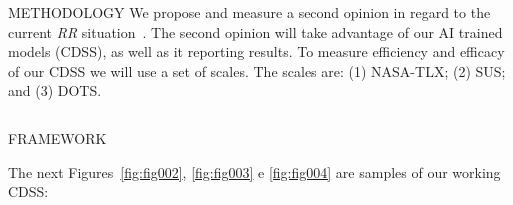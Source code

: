 \documentclass[final]{beamer}
\begin{document}
\begin{frame}[t, fragile = singleslide]{}
\begin{columns}[t]
\begin{column}{0.45\textwidth}
\begin{block}{METHODOLOGY}
We propose and measure a second opinion in regard to the current \textit{RR} situation~\cite{https://doi.org/10.13140/rg.2.2.16566.14403/1}.
The second opinion will take advantage of our AI trained models (CDSS), as well as it reporting results.
To measure efficiency and efficacy of our CDSS we will use a set of scales. The scales are: (1) NASA-TLX; (2) SUS; and (3) DOTS.

\vspace{10mm}

\end{block}

\end{column}

\end{columns}

\begin{columns}[t]

\begin{column}{0.945\textwidth}

\begin{block}{FRAMEWORK}

The next Figures~\ref{fig:fig002}, \ref{fig:fig003} e \ref{fig:fig004} are samples of our working CDSS:


\end{block}
\end{column}
\end{columns}
\end{frame}
\end{document}
